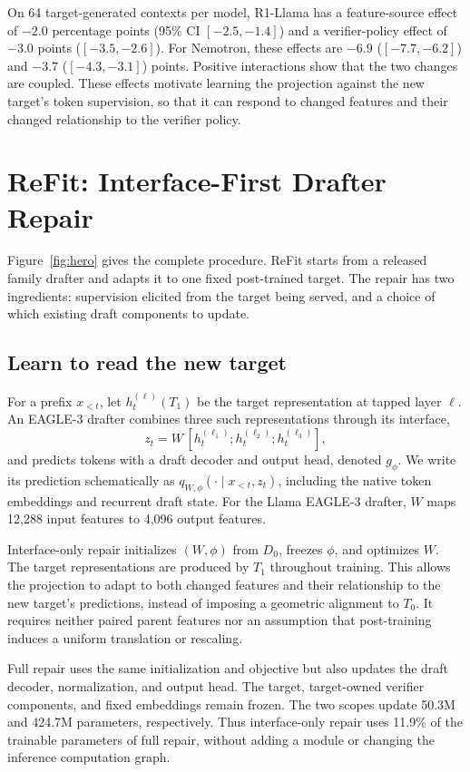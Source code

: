 \documentclass[11pt]{article}
\newcommand{\method}{ReFit}
\begin{document}
On 64 target-generated contexts per model, R1-Llama has a feature-source effect of $-2.0$ percentage points (95\% CI $[-2.5,-1.4]$) and a verifier-policy effect of $-3.0$ points ($[-3.5,-2.6]$). For Nemotron, these effects are $-6.9$ ($[-7.7,-6.2]$) and $-3.7$ ($[-4.3,-3.1]$) points. Positive interactions show that the two changes are coupled. These effects motivate learning the projection against the new target's token supervision, so that it can respond to changed features and their changed relationship to the verifier policy.

\section{\method{}: Interface-First Drafter Repair}
\label{sec:method}
Figure~\ref{fig:hero} gives the complete procedure. \method{} starts from a released family drafter and adapts it to one fixed post-trained target. The repair has two ingredients: supervision elicited from the target being served, and a choice of which existing draft components to update.

\subsection{Learn to read the new target}
For a prefix $x_{<t}$, let $h_t^{(\ell)}(T_1)$ be the target representation at tapped layer $\ell$. An EAGLE-3 drafter combines three such representations through its interface,
\begin{equation}
z_t = W\,[h_t^{(\ell_1)};h_t^{(\ell_2)};h_t^{(\ell_3)}],
\label{eq:interface}
\end{equation}
and predicts tokens with a draft decoder and output head, denoted $g_\phi$. We write its prediction schematically as $q_{W,\phi}(\cdot\mid x_{<t},z_t)$, including the native token embeddings and recurrent draft state. For the Llama EAGLE-3 drafter, $W$ maps 12,288 input features to 4,096 output features.

Interface-only repair initializes $(W,\phi)$ from $D_0$, freezes $\phi$, and optimizes $W$. The target representations are produced by $T_1$ throughout training. This allows the projection to adapt to both changed features and their relationship to the new target's predictions, instead of imposing a geometric alignment to $T_0$. It requires neither paired parent features nor an assumption that post-training induces a uniform translation or rescaling.

Full repair uses the same initialization and objective but also updates the draft decoder, normalization, and output head. The target, target-owned verifier components, and fixed embeddings remain frozen. The two scopes update 50.3M and 424.7M parameters, respectively. Thus interface-only repair uses 11.9\% of the trainable parameters of full repair, without adding a module or changing the inference computation graph.
\end{document}
